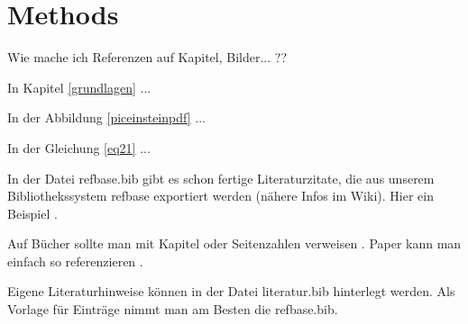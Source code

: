 \chapter{Methods}
\label{methods}
\thispagestyle{empty}


Wie mache ich Referenzen auf Kapitel, Bilder... ??

In Kapitel \ref{grundlagen} ...

In der Abbildung \ref{piceinsteinpdf}  ...

In der Gleichung \ref{eq21} ...

In der Datei refbase.bib gibt es schon fertige Literaturzitate, die aus unserem Bibliothekssystem refbase exportiert werden (n\"ahere Infos im Wiki). Hier ein Beispiel \cite{riedel02}. 

Auf B\"ucher sollte man mit Kapitel \cite[Chap. 5]{belytschko00} oder Seitenzahlen verweisen \cite[pp. 239--240]{belytschko00}. Paper kann man einfach so referenzieren \cite{calkins12}.


Eigene Literaturhinweise k\"onnen in der Datei literatur.bib hinterlegt werden. Als Vorlage f\"ur Eintr\"age nimmt man am Besten die refbase.bib.

